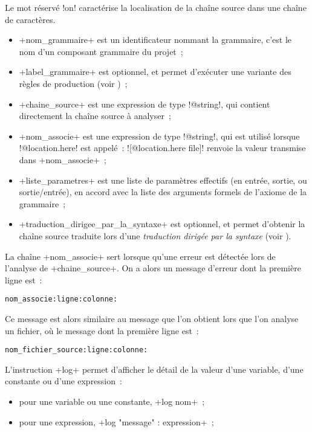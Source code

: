 Le mot réservé \ggs!on! caractérise la localisation de la chaîne source dans une chaîne de caractères.
\begin{itemize}
  \item \ggs+nom_grammaire+ est un identificateur nommant la grammaire, c'est le nom d'un composant grammaire du projet~;
  \item \ggs+label_grammaire+ est optionnel, et permet d'exécuter une variante des règles de production (voir )~;
  \item \ggs+chaine_source+ est une expression de type \ggs!@string!, qui contient directement la chaîne source à analyser~;
  \item \ggs+nom_associe+ est une expression de type \ggs!@string!, qui est utilisé lorsque \ggs!@location.here! est appelé~: \ggs![@location.here file]! renvoie la valeur transmise dans \ggs+nom_associe+~;
  \item \ggs+liste_parametres+ est une liste de paramètres effectifs (en entrée, sortie, ou sortie/entrée), en accord avec la liste des arguments formels de l'axiome de la grammaire~;
  \item \ggs+traduction_dirigee_par_la_syntaxe+ est optionnel, et permet d'obtenir la chaîne source traduite lors d'une \emph{traduction dirigée par la syntaxe} (voir ).
\end{itemize}



La chaîne \ggs+nom_associe+ sert lorsque qu'une erreur est détectée lors de l'analyse de \ggs+chaine_source+. On a alors un message d'erreur dont la première ligne est~:

\texttt{nom\_associe:ligne:colonne:}

Ce message est alors similaire au message que l'on obtient lors que l'on analyse un fichier, où le message dont la première ligne est~:

\texttt{nom\_fichier\_source:ligne:colonne:}














L'instruction \ggs+log+ permet d'afficher le détail de la valeur d'une variable, d'une constante ou d'une expression~:
\begin{itemize}
  \item pour une variable ou une constante, \ggs+log nom+~;
  \item pour une expression, \ggs+log "message" : expression+~;
\end{itemize}

